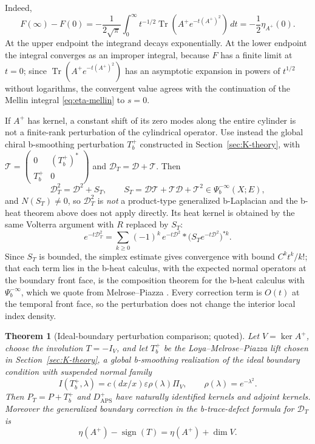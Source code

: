 \documentclass[12pt,oneside,reqno]{article}
\DeclareMathOperator{\Tr}{Tr}
\theoremstyle{plain}
\newtheorem{theorem}{Theorem}[section]
\theoremstyle{definition}
\theoremstyle{remark}
\begin{document}
Indeed,
\[
 F(\infty)-F(0)
 =
 -\frac1{2\sqrt\pi}
 \int_0^\infty t^{-1/2}\Tr(A^+e^{-t(A^+)^2})\,dt
 =-\frac12\eta_{A^+}(0).
\]
At the upper endpoint the integrand decays exponentially. At the lower
endpoint the integral converges as an improper integral, because \(F\) has
a finite limit at \(t=0\); since \(\Tr(A^+e^{-t(A^+)^2})\) has an
asymptotic expansion in powers of \(t^{1/2}\) without logarithms, the
convergent value agrees with the continuation of the Mellin integral
\eqref{eq:eta-mellin} to \(s=0\).

If \(A^+\) has kernel, a constant shift of its zero modes along the entire
cylinder is not a finite-rank perturbation of the cylindrical operator.
Use instead the global chiral b-smoothing perturbation \(T_b^+\) constructed
in Section~\ref{sec:K-theory}, with
\(\mathcal T=\begin{pmatrix}0&(T_b^+)^*\\T_b^+&0\end{pmatrix}\) and
\(\mathcal D_T=\mathcal D+\mathcal T\). Then
\[
 \mathcal D_T^2=\mathcal D^2+S_T,\qquad
 S_T=\mathcal D\mathcal T+\mathcal T\mathcal D+\mathcal T^2
 \in\Psi_b^{-\infty}(X;E),
\]
and \(N(S_T)\neq0\), so \(\mathcal D_T^2\) is \emph{not} a product-type
generalized b-Laplacian and the b-heat theorem above does not apply
directly. Its heat kernel is obtained by the same Volterra argument with
\(R\) replaced by \(S_T\):
\[
 e^{-t\mathcal D_T^2}
 =\sum_{k\geq0}(-1)^k\,e^{-t\mathcal D^2}*
   \bigl(S_Te^{-t\mathcal D^2}\bigr)^{*k}.
\]
Since \(S_T\) is bounded, the simplex estimate gives convergence with
bound \(C^kt^k/k!\); that each term lies in the b-heat calculus, with
the expected normal operators at the boundary front face, is the
composition theorem for the b-heat calculus with \(\Psi_b^{-\infty}\),
which we quote from Melrose--Piazza \cite{MelrosePiazza}. Every
correction term is \(O(t)\) at the temporal front face, so the
perturbation does not change the interior local index density.

\begin{theorem}[Ideal-boundary perturbation comparison; quoted]
Let \(V=\ker A^+\), choose the involution \(T=-I_V\), and let \(T_b^+\)
be the Loya--Melrose--Piazza lift chosen in Section~\ref{sec:K-theory},
a global b-smoothing realization of the ideal boundary condition with
suspended normal family
\[
 I(T_b^+,\lambda)
 =c(dx/x)\varepsilon\rho(\lambda)\Pi_V,
 \qquad \rho(\lambda)=e^{-\lambda^2}.
\]
Then \(P_T=P+T_b^+\) and \(D^+_{\mathrm{APS}}\) have naturally identified
kernels and adjoint kernels. Moreover the generalized boundary correction
in the b-trace-defect formula for \(\mathcal D_T\) is
\[
 \eta(A^+)-\operatorname{sign}(T)
 =\eta(A^+)+\dim V.
\]
\end{theorem}
\end{document}
